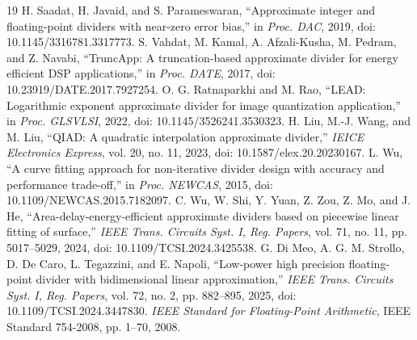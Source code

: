 \documentclass[conference]{IEEEtran}
\begin{document}
\begin{thebibliography}{19}
H. Saadat, H. Javaid, and S. Parameswaran, ``Approximate integer and
floating-point dividers with near-zero error bias,'' in \emph{Proc. DAC},
2019, doi: 10.1145/3316781.3317773.
S. Vahdat, M. Kamal, A. Afzali-Kusha, M. Pedram, and Z. Navabi,
``TruncApp: A truncation-based approximate divider for energy efficient DSP
applications,'' in \emph{Proc. DATE}, 2017,
doi: 10.23919/DATE.2017.7927254.
O. G. Ratnaparkhi and M. Rao, ``LEAD: Logarithmic exponent approximate divider
for image quantization application,'' in \emph{Proc. GLSVLSI}, 2022,
doi: 10.1145/3526241.3530323.
H. Liu, M.-J. Wang, and M. Liu, ``QIAD: A quadratic interpolation approximate
divider,'' \emph{IEICE Electronics Express}, vol. 20, no. 11, 2023,
doi: 10.1587/elex.20.20230167.
L. Wu, ``A curve fitting approach for non-iterative divider design with
accuracy and performance trade-off,'' in \emph{Proc. NEWCAS}, 2015,
doi: 10.1109/NEWCAS.2015.7182097.
C. Wu, W. Shi, Y. Yuan, Z. Zou, Z. Mo, and J. He,
``Area-delay-energy-efficient approximate dividers based on piecewise linear
fitting of surface,'' \emph{IEEE Trans. Circuits Syst. I, Reg. Papers},
vol. 71, no. 11, pp. 5017--5029, 2024,
doi: 10.1109/TCSI.2024.3425538.
G. Di Meo, A. G. M. Strollo, D. De Caro, L. Tegazzini, and E. Napoli,
``Low-power high precision floating-point divider with bidimensional linear
approximation,'' \emph{IEEE Trans. Circuits Syst. I, Reg. Papers}, vol. 72,
no. 2, pp. 882--895, 2025, doi: 10.1109/TCSI.2024.3447830.
\emph{IEEE Standard for Floating-Point Arithmetic}, IEEE Standard 754-2008,
pp. 1--70, 2008.
\end{thebibliography}
\end{document}
